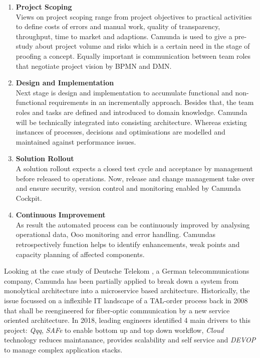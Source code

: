 \begin{enumerate} %
\item \textbf{Project Scoping} 
\\Views on project scoping range from project objectives to practical activities to define costs of errors and manual work, quality of transparency, throughput, time to market and adaptions. 
Camunda is used to give a pre-study about project volume and risks which is a certain need in the stage of proofing a concept. Equally important is communication between team roles that negotiate project vision by BPMN and DMN.
\item \textbf{Design and Implementation}
\\Next stage is design and implementation to accumulate functional and non-functional requirements in an incrementally approach. Besides that, the team roles and tasks are defined and introduced to domain knowledge. Camunda will be technically integrated into consisting architecture. Whereas existing instances of processes, decisions and optimisations are modelled and maintained against performance issues. 
\item \textbf{Solution Rollout}
\\A solution rollout expects a closed test cycle and acceptance by management before released to operations. Now, release and change management take over and ensure security, version control and monitoring enabled by Camunda Cockpit.
\item \textbf{Continuous Improvement}
\\As result the automated process can be continuously improved by analysing operational data, \gls{Ooo} monitoring and error handling. Camundas retrospectively function helps to identify enhancements, weak points and capacity planning of affected components.
\end{enumerate}

Looking at the case study of Deutsche Telekom \cite{FriedbertSamland.}, a German telecommunications company, Camunda has been partially applied to break down a system from monolytical architecture into a microservice based architecture. Historically, the issue focussed on a inflexible IT landscape of a TAL-order process back in 2008 that shall be reengineered for fiber-optic communication by a new service oriented architecture. In 2018, leading engineers identified 4 main drivers to this project: \textit{\gls{Qqq}}, \textit{\gls{SAFe}} to enable bottom up and top down workflow, \textit{Cloud} technology reduces maintanance, provides scalability and self service and \textit{\gls{DEVOP}} to manage complex application stacks.

